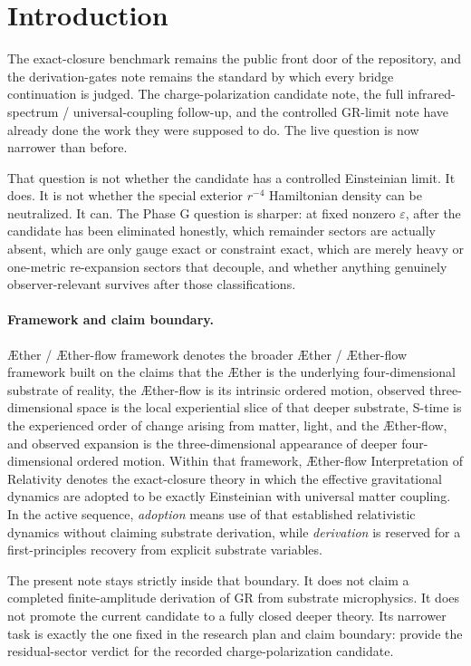\documentclass[11pt]{article}
\newcommand{\Aether}{\AE{}ther}
\newcommand{\Aflow}{\AE{}ther-flow}
\newcommand{\TheoryName}{\Aflow{} Interpretation of Relativity}
\newcommand{\TheoryProgram}{\Aether{} / \Aflow{} framework}
\newcommand{\epsIR}{\varepsilon}
\begin{document}
\section{Introduction}

The exact-closure benchmark remains the public front door of the repository, and the derivation-gates note remains the standard by which every bridge continuation is judged. The charge-polarization candidate note, the full infrared-spectrum / universal-coupling follow-up, and the controlled GR-limit note have already done the work they were supposed to do. The live question is now narrower than before.

That question is not whether the candidate has a controlled Einsteinian limit. It does. It is not whether the special exterior \(r^{-4}\) Hamiltonian density can be neutralized. It can. The Phase G question is sharper: at fixed nonzero \(\epsIR\), after the candidate has been eliminated honestly, which remainder sectors are actually absent, which are only gauge exact or constraint exact, which are merely heavy or one-metric re-expansion sectors that decouple, and whether anything genuinely observer-relevant survives after those classifications.

\paragraph{Framework and claim boundary.}
\TheoryProgram{} denotes the broader \Aether{} / \Aflow{} framework built on the claims that the \Aether{} is the underlying four-dimensional substrate of reality, the \Aflow{} is its intrinsic ordered motion, observed three-dimensional space is the local experiential slice of that deeper substrate, S-time is the experienced order of change arising from matter, light, and the \Aflow{}, and observed expansion is the three-dimensional appearance of deeper four-dimensional ordered motion. Within that framework, \TheoryName{} denotes the exact-closure theory in which the effective gravitational dynamics are adopted to be exactly Einsteinian with universal matter coupling. In the active sequence, \emph{adoption} means use of that established relativistic dynamics without claiming substrate derivation, while \emph{derivation} is reserved for a first-principles recovery from explicit substrate variables.

The present note stays strictly inside that boundary. It does not claim a completed finite-amplitude derivation of GR from substrate microphysics. It does not promote the current candidate to a fully closed deeper theory. Its narrower task is exactly the one fixed in the research plan and claim boundary: provide the residual-sector verdict for the recorded charge-polarization candidate.
\end{document}
